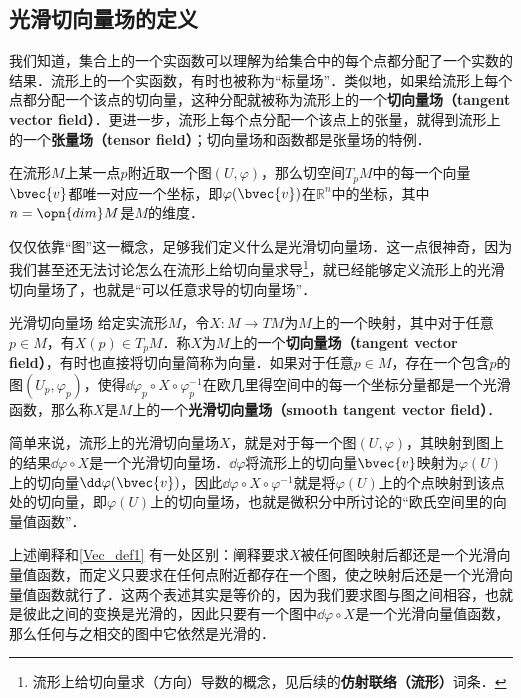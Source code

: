
\subsection{光滑切向量场的定义}

我们知道，集合上的一个实函数可以理解为给集合中的每个点都分配了一个实数的结果．流形上的一个实函数，有时也被称为“标量场”．类似地，如果给流形上每个点都分配一个该点的切向量，这种分配就被称为流形上的一个\textbf{切向量场（tangent vector field）}．更进一步，流形上每个点分配一个该点上的张量，就得到流形上的一个\textbf{张量场（tensor field）}；切向量场和函数都是张量场的特例．


在流形$M$上某一点$p$附近取一个图$(U, \varphi)$，那么切空间$T_pM$中的每一个向量$\bvec{v}$都唯一对应一个坐标，即$\varphi(\bvec{v})$在$\mathbb{R}^n$中的坐标，其中$n=\opn{dim}M$是$M$的维度．

仅仅依靠“图”这一概念，足够我们定义什么是光滑切向量场．这一点很神奇，因为我们甚至还无法讨论怎么在流形上给切向量求导\footnote{流形上给切向量求（方向）导数的概念，见后续的\textbf{仿射联络（流形）}词条．}，就已经能够定义流形上的光滑切向量场了，也就是“可以任意求导的切向量场”．

\begin{definition}{光滑切向量场}\label{Vec_def1}
给定实流形$M$，令$X:M\to TM$为$M$上的一个映射，其中对于任意$p\in M$，有$X(p)\in T_pM$．称$X$为$M$上的一个\textbf{切向量场（tangent vector field）}，有时也直接将切向量简称为向量．如果对于任意$p\in M$，存在一个包含$p$的图$(U_p, \varphi_p)$，使得$\dd\varphi_p\circ X\circ\varphi_p^{-1}$在欧几里得空间中的每一个坐标分量都是一个光滑函数，那么称$X$是$M$上的一个\textbf{光滑切向量场（smooth tangent vector field）}．
\end{definition}

简单来说，流形上的光滑切向量场$X$，就是对于每一个图$(U, \varphi)$，其映射到图上的结果$\dd\varphi\circ X$是一个光滑切向量场．$\dd\varphi$将流形上的切向量$\bvec{v}$映射为$\varphi(U)$上的切向量$\dd\varphi(\bvec{v})$，因此$\dd\varphi\circ X\circ\varphi^{-1}$就是将$\varphi(U)$上的个点映射到该点处的切向量，即$\varphi(U)$上的切向量场，也就是微积分中所讨论的“欧氏空间里的向量值函数”．

上述阐释和\autoref{Vec_def1} 有一处区别：阐释要求$X$被任何图映射后都还是一个光滑向量值函数，而定义只要求在任何点附近都存在一个图，使之映射后还是一个光滑向量值函数就行了．这两个表述其实是等价的，因为我们要求图与图之间相容，也就是彼此之间的变换是光滑的，因此只要有一个图中$\dd\varphi\circ X$是一个光滑向量值函数，那么任何与之相交的图中它依然是光滑的．

